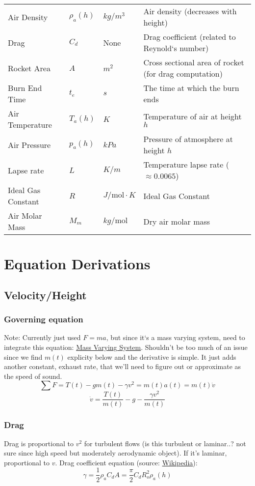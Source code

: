 \documentclass[12pt,a4paper]{article}
\begin{document}
\begin{tabular}{l | l | l | l}
    Air Density        & $\rho_a(h)$ & $kg/m^3$              & Air density (decreases with height) \\
    Drag               & $C_d$       & None                  & Drag coefficient (related to Reynold‘s number) \\
    Rocket Area        & $A$         & $m^2$                 & Cross sectional area of rocket (for drag computation) \\
    Burn End Time      & $t_e$       & $s$                   & The time at which the burn ends \\
    Air Temperature    & $T_a(h)$    & $K$                   & Temperature of air at height $h$ \\
    Air Pressure       & $p_a(h)$    & $kPa$                 & Pressure of atmosphere at height $h$ \\
    Lapse rate         & $L$         & $K/m$                 & Temperature lapse rate ($\approx 0.0065$) \\
    Ideal Gas Constant & $R$         & $J/\text{mol}\cdot K$ & Ideal Gas Constant \\
    Air Molar Mass     & $M_m$       & $kg/\text{mol}$       & Dry air molar mass
\end{tabular}

\section{Equation Derivations}
\subsection{Velocity/Height}
\subsubsection{Governing equation}
Note: Currently just used $F=ma$, but since it‘s a mass varying system, need to integrate this equation: \hyperlink{’https://en.wikipedia.org/wiki/Variable-mass_system}{Mass Varying System}. Shouldn’t be too much of an issue since we find $m(t)$ explicity below and the derivative is simple. It just adds another constant, exhaust rate, that we’ll need to figure out or approximate as the speed of sound.
$$\sum F = T(t) - gm(t) - \gamma v^2 = m(t)a(t) = m(t)\dot{v}$$
\begin{equation}
\dot{v} = \frac{T(t)}{m(t)} - g - \frac{\gamma v^2}{m(t)}
\label{eq:main}
\end{equation}

\subsubsection{Drag}
Drag is proportional to $v^2$ for turbulent flows (is this turbulent or laminar..? not sure since high speed but moderately aerodynamic object). If it’s laminar, proportional to $v$.
Drag coefficient equation (source: \href{https://en.wikipedia.org/wiki/Drag_(physics)#Types_of_drag}{Wikipedia}):
\begin{equation}
\gamma = \frac{1}{2}\rho_a C_d A = \frac{\pi}{2} C_d R_o^2\rho_a(h)
\label{eq:gamma}
\end{equation}
\end{document}
